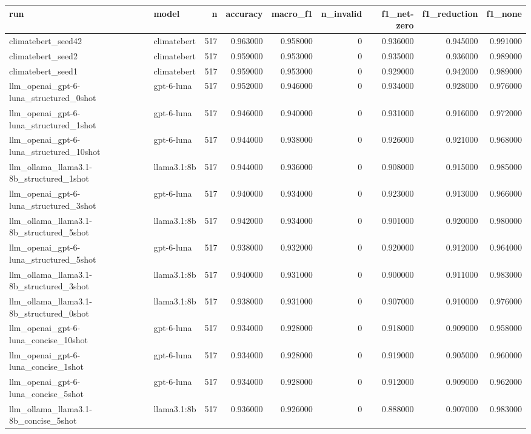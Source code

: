 \begin{tabular}{llrrrrrrr}
\toprule
run & model & n & accuracy & macro_f1 & n_invalid & f1_net-zero & f1_reduction & f1_none \\
\midrule
climatebert_seed42 & climatebert & 517 & 0.963000 & 0.958000 & 0 & 0.936000 & 0.945000 & 0.991000 \\
climatebert_seed2 & climatebert & 517 & 0.959000 & 0.953000 & 0 & 0.935000 & 0.936000 & 0.989000 \\
climatebert_seed1 & climatebert & 517 & 0.959000 & 0.953000 & 0 & 0.929000 & 0.942000 & 0.989000 \\
llm_openai_gpt-6-luna_structured_0shot & gpt-6-luna & 517 & 0.952000 & 0.946000 & 0 & 0.934000 & 0.928000 & 0.976000 \\
llm_openai_gpt-6-luna_structured_1shot & gpt-6-luna & 517 & 0.946000 & 0.940000 & 0 & 0.931000 & 0.916000 & 0.972000 \\
llm_openai_gpt-6-luna_structured_10shot & gpt-6-luna & 517 & 0.944000 & 0.938000 & 0 & 0.926000 & 0.921000 & 0.968000 \\
llm_ollama_llama3.1-8b_structured_1shot & llama3.1:8b & 517 & 0.944000 & 0.936000 & 0 & 0.908000 & 0.915000 & 0.985000 \\
llm_openai_gpt-6-luna_structured_3shot & gpt-6-luna & 517 & 0.940000 & 0.934000 & 0 & 0.923000 & 0.913000 & 0.966000 \\
llm_ollama_llama3.1-8b_structured_5shot & llama3.1:8b & 517 & 0.942000 & 0.934000 & 0 & 0.901000 & 0.920000 & 0.980000 \\
llm_openai_gpt-6-luna_structured_5shot & gpt-6-luna & 517 & 0.938000 & 0.932000 & 0 & 0.920000 & 0.912000 & 0.964000 \\
llm_ollama_llama3.1-8b_structured_3shot & llama3.1:8b & 517 & 0.940000 & 0.931000 & 0 & 0.900000 & 0.911000 & 0.983000 \\
llm_ollama_llama3.1-8b_structured_0shot & llama3.1:8b & 517 & 0.938000 & 0.931000 & 0 & 0.907000 & 0.910000 & 0.976000 \\
llm_openai_gpt-6-luna_concise_10shot & gpt-6-luna & 517 & 0.934000 & 0.928000 & 0 & 0.918000 & 0.909000 & 0.958000 \\
llm_openai_gpt-6-luna_concise_1shot & gpt-6-luna & 517 & 0.934000 & 0.928000 & 0 & 0.919000 & 0.905000 & 0.960000 \\
llm_openai_gpt-6-luna_concise_5shot & gpt-6-luna & 517 & 0.934000 & 0.928000 & 0 & 0.912000 & 0.909000 & 0.962000 \\
llm_ollama_llama3.1-8b_concise_5shot & llama3.1:8b & 517 & 0.936000 & 0.926000 & 0 & 0.888000 & 0.907000 & 0.983000 \\

\end{tabular}
